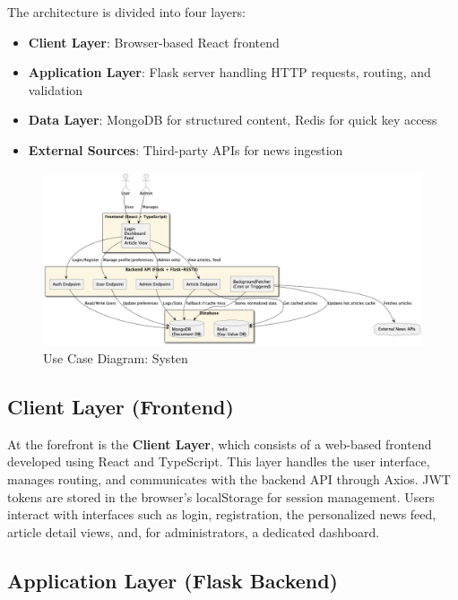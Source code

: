 The architecture is divided into four layers:
\begin{itemize}
    \item \textbf{Client Layer}: Browser-based React frontend
    \item \textbf{Application Layer}: Flask server handling HTTP requests, routing, and validation
    \item \textbf{Data Layer}: MongoDB for structured content, Redis for quick key access
    \item \textbf{External Sources}: Third-party APIs for news ingestion
\end{itemize}


\begin{figure}[!h]
    \centering
    \includegraphics[width=1.1\textwidth]{chapters/chapter_03/system-architecture-smart-news-aggregator}
    \caption{Use Case Diagram: Systen}
    \label{fig:use-case-diagram-system}
\end{figure}

\subsection{Client Layer (Frontend)}\label{subsec:client-layer-frontend}

At the forefront is the \textbf{Client Layer}, which consists of a web-based frontend developed using React and TypeScript.
This layer handles the user interface, manages routing, and communicates with the backend API through Axios.
JWT tokens are stored in the browser’s localStorage for session management.
Users interact with interfaces such as login, registration, the personalized news feed, article detail views, and, for administrators, a dedicated dashboard.

\subsection{Application Layer (Flask Backend)}\label{subsec:application-layer-flask-backend}

